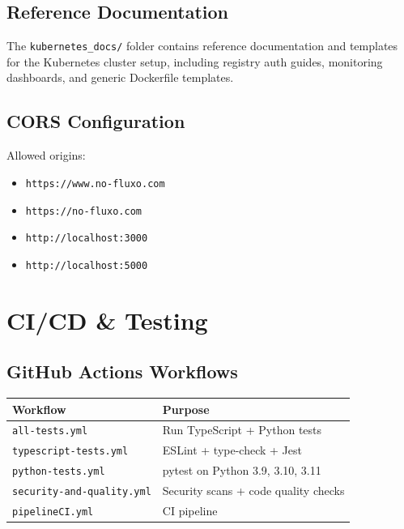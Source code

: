 \documentclass[11pt,a4paper]{article}
\newcommand{\code}[1]{\texttt{#1}}
\begin{document}
\subsection{Reference Documentation}

The \code{kubernetes\_docs/} folder contains reference documentation and templates
for the Kubernetes cluster setup, including registry auth guides, monitoring
dashboards, and generic Dockerfile templates.

\subsection{CORS Configuration}

Allowed origins:
\begin{itemize}[noitemsep]
    \item \code{https://www.no-fluxo.com}
    \item \code{https://no-fluxo.com}
    \item \code{http://localhost:3000}
    \item \code{http://localhost:5000}
\end{itemize}

\section{CI/CD \& Testing}

\subsection{GitHub Actions Workflows}

\begin{center}
\begin{longtable}{@{}L{4.5cm}L{8cm}@{}}
\toprule
\textbf{Workflow} & \textbf{Purpose} \\
\midrule
\endhead
\code{all-tests.yml}            & Run TypeScript + Python tests \\
\code{typescript-tests.yml}     & ESLint + type-check + Jest \\
\code{python-tests.yml}         & pytest on Python 3.9, 3.10, 3.11 \\
\code{security-and-quality.yml} & Security scans + code quality checks \\
\code{pipelineCI.yml}           & CI pipeline \\
\bottomrule
\end{longtable}
\end{center}
\end{document}
